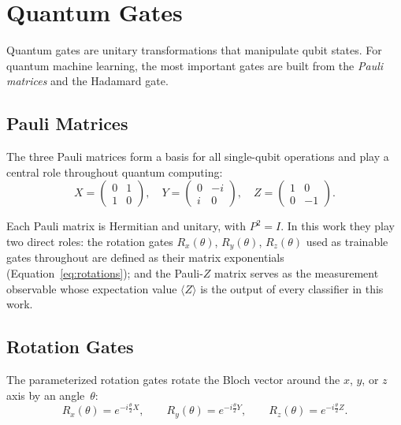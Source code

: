 \section{Quantum Gates}
\label{sec:gates}

Quantum gates are unitary transformations that manipulate qubit states. For quantum machine learning, the most important gates are built from the \emph{Pauli matrices} and the Hadamard gate.

\subsection{Pauli Matrices}

The three Pauli matrices form a basis for all single-qubit operations and play a central role throughout quantum computing:
\begin{equation}
    X = \begin{pmatrix} 0 & 1 \\ 1 & 0 \end{pmatrix}, \quad
    Y = \begin{pmatrix} 0 & -i \\ i & 0 \end{pmatrix}, \quad
    Z = \begin{pmatrix} 1 & 0 \\ 0 & -1 \end{pmatrix}.
    \label{eq:pauli}
\end{equation}

Each Pauli matrix is Hermitian and unitary, with $P^2 = I$. In this work they play two direct roles: the rotation gates $R_x(\theta)$, $R_y(\theta)$, $R_z(\theta)$ used as trainable gates throughout are defined as their matrix exponentials (Equation~\ref{eq:rotations}); and the Pauli-$Z$ matrix serves as the measurement observable whose expectation value $\langle Z \rangle$ is the output of every classifier in this work.

\subsection{Rotation Gates}

The parameterized rotation gates rotate the Bloch vector around the $x$, $y$, or $z$ axis by an angle~$\theta$:
\begin{equation}
    R_x(\theta) = e^{-i\frac{\theta}{2}X}, \qquad
    R_y(\theta) = e^{-i\frac{\theta}{2}Y}, \qquad
    R_z(\theta) = e^{-i\frac{\theta}{2}Z}.
    \label{eq:rotations}
\end{equation}

